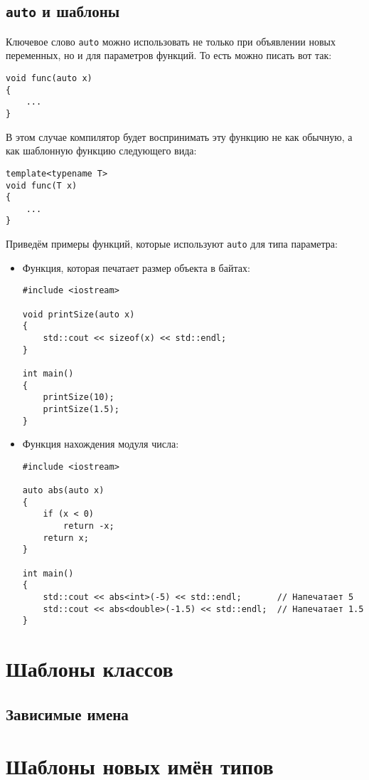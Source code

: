 \documentclass{article}
\begin{document}
\subsection*{\texttt{auto} и шаблоны}
Ключевое слово \texttt{auto} можно использовать не только при объявлении новых переменных, но и для параметров функций. То есть можно писать вот так:
\begin{lstlisting}
void func(auto x)
{
	...
}
\end{lstlisting}
В этом случае компилятор будет воспринимать эту функцию не как обычную, а как шаблонную функцию следующего вида:
\begin{lstlisting}
template<typename T>
void func(T x)
{
	...
}
\end{lstlisting}
Приведём примеры функций, которые используют \texttt{auto} для типа параметра:
\begin{itemize}
\item Функция, которая печатает размер объекта в байтах:
\begin{lstlisting}
#include <iostream>

void printSize(auto x)
{
	std::cout << sizeof(x) << std::endl;
}

int main()
{
	printSize(10);
	printSize(1.5);
}
\end{lstlisting}

\item Функция нахождения модуля числа:
\begin{lstlisting}
#include <iostream>

auto abs(auto x)
{
	if (x < 0)
		return -x;
	return x;
}

int main()
{
	std::cout << abs<int>(-5) << std::endl;       // Напечатает 5
	std::cout << abs<double>(-1.5) << std::endl;  // Напечатает 1.5
}
\end{lstlisting}
\end{itemize}
\section*{Шаблоны классов}

\subsection*{Зависимые имена}

\section*{Шаблоны новых имён типов}
\end{document}
